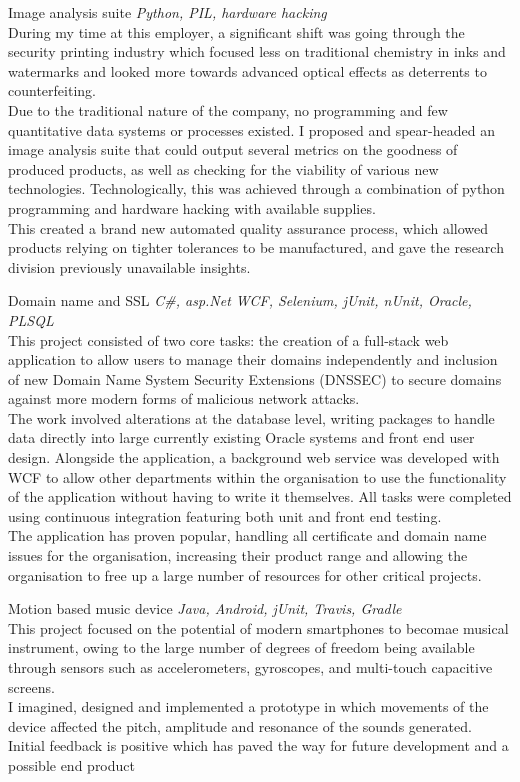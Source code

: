 \documentclass[]{friggeri-cv} %
\begin{document}
\begin{projectentrylist}
\projectentry
{Image analysis suite}
{\emph{Python, PIL, hardware hacking} \\
During my time at this employer, a significant shift was going through the security printing industry which focused less on traditional chemistry in inks and watermarks and looked more towards advanced optical effects as deterrents to counterfeiting. \\
Due to the traditional nature of the company, no programming and few quantitative data systems or processes existed. I proposed and spear-headed an image analysis suite that could output several metrics on the goodness of produced products, as well as checking for the viability of various new technologies. Technologically, this was achieved through a combination of python programming and hardware hacking with available supplies. \\
This created a brand new automated quality assurance process, which allowed products relying on tighter tolerances to be manufactured, and gave the research division previously unavailable insights.}

\projectentry
{Domain name and SSL}
{\emph{C\#, asp.Net WCF, Selenium, jUnit, nUnit, Oracle, PLSQL } \\
This project consisted of two core tasks: the creation of a full-stack web application to allow users to manage their domains independently and inclusion of new Domain Name System Security Extensions (DNSSEC) to secure domains against more modern forms of malicious network attacks.
\\
The work involved alterations at the database level, writing packages to handle data directly into large currently existing Oracle systems  and front end user design. Alongside the application, a background web service was developed with WCF to allow other departments within the organisation to use the functionality of the application without having to write it themselves. All tasks were completed using continuous integration featuring both unit and front end testing.
\\
The application has proven popular, handling all certificate and domain name issues for the organisation, increasing their product range and allowing the organisation to free up a large number of resources for other critical projects.}

\projectentry
{Motion based music device} 
{\emph{Java, Android, jUnit, Travis, Gradle} \\
This project focused on the potential of modern smartphones to becomae musical instrument, owing to the large number of degrees of freedom being available through sensors such as accelerometers, gyroscopes, and multi-touch capacitive screens. \\
I imagined, designed and implemented a prototype in which movements of the device affected the pitch, amplitude and resonance of the sounds generated. Initial feedback is positive which has paved the way for future development and a possible end product}


\end{projectentrylist}
\end{document}
